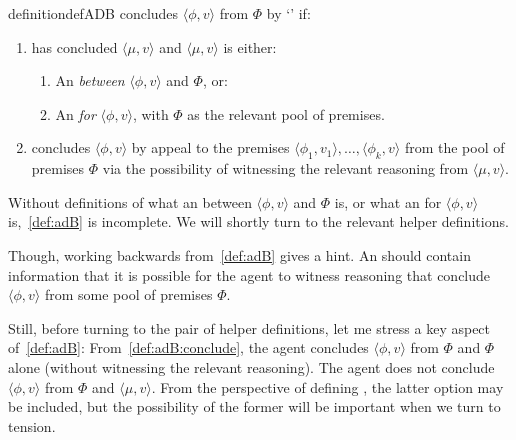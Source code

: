 \begin{note}
  \begin{restatable}[\adB{}]{definition}{defADB}
    \label{def:adB}
    \vAgent{} concludes \(\langle \phi,v \rangle\) from \(\Phi\) by `\adB{}' if:
    \begin{enumerate}[label=\textsf{I}:\arabic*., ref=(\textsf{I}:\arabic*)]
    \item
      \label{def:adB:itp}
      \vAgent{} has concluded \(\langle \mu,v \rangle\) and  \(\langle \mu,v \rangle\) is either:
      \begin{enumerate}
      \item
        \label{def:adB:itp:between}
        An \itp{} \emph{between} \(\langle \phi,v \rangle\) and \(\Phi\), or:
      \item
        \label{def:adB:itp:for}
        An \itp{} \emph{for} \(\langle \phi,v \rangle\), with \(\Phi\) as the relevant pool of premises.
      \end{enumerate}
    \item
      \label{def:adB:conclude}
      \vAgent{} concludes \(\langle \phi,v \rangle\) by appeal to the premises \(\langle \phi_{1},v_{1} \rangle, \dots, \langle \phi_{k},v \rangle\) from the pool of premises \(\Phi\) via the possibility of witnessing the relevant reasoning from \(\langle \mu,v \rangle\).
    \end{enumerate}
    \vspace{-\baselineskip}
  \end{restatable}
\end{note}

\begin{note}
  Without definitions of what an  between \(\langle \phi,v \rangle\) and \(\Phi\) is, or what an  for \(\langle \phi,v \rangle\) is,~\autoref{def:adB} is incomplete.
  We will shortly turn to the relevant helper definitions.

  Though, working backwards from~\autoref{def:adB} gives a hint.
  An \itp{} should contain information that it is possible for the agent to witness reasoning that conclude \(\langle \phi,v \rangle\) from some pool of premises \(\Phi\).
\end{note}

\begin{note}
  Still, before turning to the pair of helper definitions, let me stress a key aspect of~\autoref{def:adB}:
  From~\ref{def:adB:conclude}, the agent concludes \(\langle \phi,v \rangle\) from \(\Phi\) and \(\Phi\) alone (without witnessing the relevant reasoning).
  The agent does not conclude \(\langle \phi,v \rangle\) from \(\Phi\) and \(\langle \mu,v \rangle\).
  From the perspective of defining \adB{}, the latter option may be included, but the possibility of the former will be important when we turn to tension.
\end{note}

